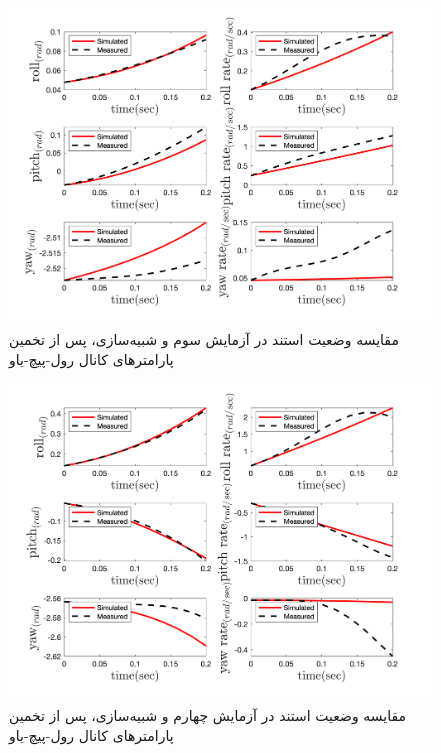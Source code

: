 \begin{figure}[H]
	\includegraphics[width=12cm]{../../Figures/RCP/roll_pitch_yaw_parameter_estimation/RCP_roll_pitch_yaw_S3.png}
	\centering
	\caption{مقايسه وضعیت استند در  آزمايش سوم و شبیه‌سازی، پس از تخمین پارامترهای کانال رول-پیچ-یاو}
	\label{ roll_pitch_yaw_ps3}
\end{figure}
\begin{figure}[H]
	\includegraphics[width=12cm]{../../Figures/RCP/roll_pitch_yaw_parameter_estimation/RCP_roll_pitch_yaw_S5.png}
	\centering
	\caption{مقايسه وضعیت استند در  آزمايش چهارم و شبیه‌سازی، پس از تخمین پارامترهای کانال رول-پیچ-یاو}
	\label{ roll_pitch_yaw_ps4}
\end{figure}
